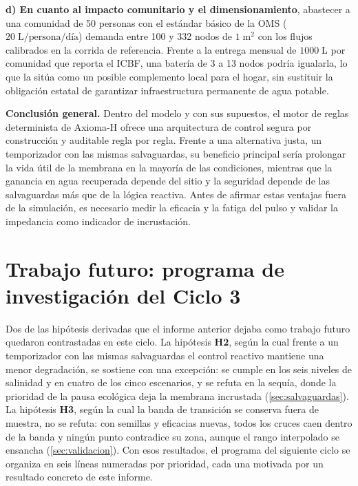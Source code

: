 \textbf{d) En cuanto al impacto comunitario y el dimensionamiento}, abastecer a una comunidad de 50 personas con el est\'andar b\'asico de la OMS ($20\;\text{L/persona/d\'ia}$) demanda entre 100 y 332 nodos de $1\;\text{m}^2$ con los flujos calibrados en la corrida de referencia. Frente a la entrega mensual de $1000\;\text{L}$ por comunidad que reporta el ICBF, una bater\'ia de 3 a 13 nodos podr\'ia igualarla, lo que la sit\'ua como un posible complemento local para el hogar, sin sustituir la obligaci\'on estatal de garantizar infraestructura permanente de agua potable.

\noindent\textbf{Conclusi\'on general.}
Dentro del modelo y con sus supuestos, el motor de reglas determinista de Axioma-H ofrece una arquitectura de control segura por construcci\'on y auditable regla por regla. Frente a una alternativa justa, un temporizador con las mismas salvaguardas, su beneficio principal ser\'ia prolongar la vida \'util de la membrana en la mayor\'ia de las condiciones, mientras que la ganancia en agua recuperada depende del sitio y la seguridad depende de las salvaguardas m\'as que de la l\'ogica reactiva. Antes de afirmar estas ventajas fuera de la simulaci\'on, es necesario medir la eficacia y la fatiga del pulso y validar la impedancia como indicador de incrustaci\'on.

\section{Trabajo futuro: programa de investigaci\'on del Ciclo 3}
\label{sec:trabajo_futuro}
Dos de las hip\'otesis derivadas que el informe anterior dejaba como trabajo futuro quedaron contrastadas en este ciclo. La hip\'otesis \textbf{H2}, seg\'un la cual frente a un temporizador con las mismas salvaguardas el control reactivo mantiene una menor degradaci\'on, se sostiene con una excepci\'on: se cumple en los seis niveles de salinidad y en cuatro de los cinco escenarios, y se refuta en la sequ\'ia, donde la prioridad de la pausa ecol\'ogica deja la membrana incrustada (\cref{sec:salvaguardas}). La hip\'otesis \textbf{H3}, seg\'un la cual la banda de transici\'on se conserva fuera de muestra, no se refuta: con semillas y eficacias nuevas, todos los cruces caen dentro de la banda y ning\'un punto contradice su zona, aunque el rango interpolado se ensancha (\cref{sec:validacion}). Con esos resultados, el programa del siguiente ciclo se organiza en seis l\'ineas numeradas por prioridad, cada una motivada por un resultado concreto de este informe.

